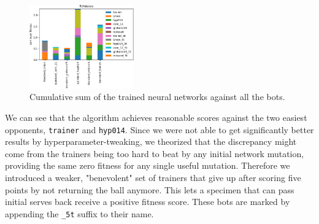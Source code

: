 \documentclass[11pt,a4paper]{scrartcl}
\begin{document}
\begin{figure}[H]
\center
\includegraphics[width=0.4\textwidth]{img/standard.png}
\caption{Cumulative sum of the trained neural networks against all the bots.}
\label{fig:standard_c}
\end{figure}

We can see that the algorithm achieves reasonable scores against the two easiest opponents, \texttt{trainer} and \texttt{hyp014}. Since we were not able to get significantly better results by hyperparameter-tweaking, we theorized that the discrepancy might come from the trainers being too hard to beat by any initial network mutation, providing the same zero fitness for any single useful mutation. Therefore we introduced a weaker, "benevolent" set of trainers that give up after scoring five points by not returning the ball anymore. This lets a specimen that can pass initial serves back receive a positive fitness score. These bots are marked by appending the \texttt{\_5t} suffix to their name.
\end{document}
